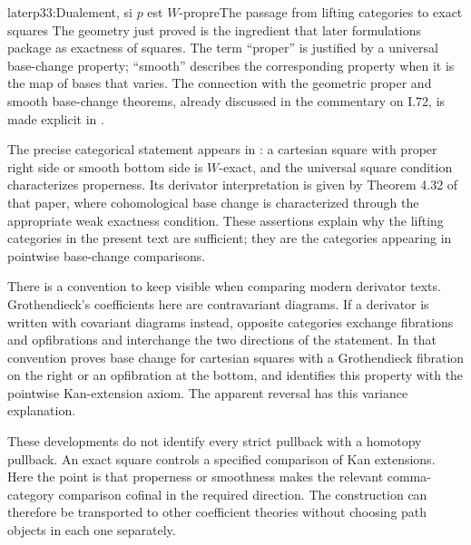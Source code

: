 \begin{dcomment}{later}{p33:Dualement, si $p$ est $W$-propre}{The passage from lifting categories to exact squares}
The geometry just proved is the ingredient that later formulations package as exactness of squares. The term ``proper'' is justified by a universal base-change property; ``smooth'' describes the corresponding property when it is the map of bases that varies. The connection with the geometric proper and smooth base-change theorems, already discussed in the commentary on I.72, is made explicit in \citet[Introduction and Theorem 1.2]{Maltsiniotis2005Asphericite}.

The precise categorical statement appears in \citet[Propositions 2.12--2.13]{Maltsiniotis2012Exact}: a cartesian square with proper right side or smooth bottom side is $W$-exact, and the universal square condition characterizes properness. Its derivator interpretation is given by Theorem 4.32 of that paper, where cohomological base change is characterized through the appropriate weak exactness condition. These assertions explain why the lifting categories in the present text are sufficient; they are the categories appearing in pointwise base-change comparisons.

There is a convention to keep visible when comparing modern derivator texts. Grothendieck's coefficients here are contravariant diagrams. If a derivator is written with covariant diagrams instead, opposite categories exchange fibrations and opfibrations and interchange the two directions of the statement. In that convention \citet[Propositions 1.24 and 1.26]{Groth2013} proves base change for cartesian squares with a Grothendieck fibration on the right or an opfibration at the bottom, and identifies this property with the pointwise Kan-extension axiom. The apparent reversal has this variance explanation.

These developments do not identify every strict pullback with a homotopy pullback. An exact square controls a specified comparison of Kan extensions. Here the point is that properness or smoothness makes the relevant comma-category comparison cofinal in the required direction. The construction can therefore be transported to other coefficient theories without choosing path objects in each one separately.
\end{dcomment}



